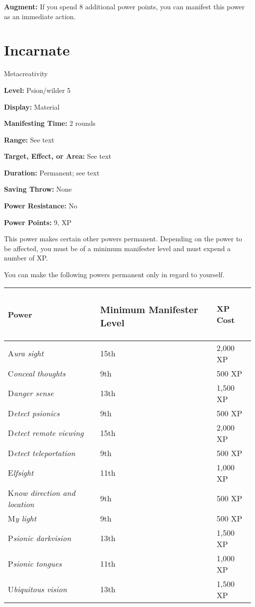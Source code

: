 \documentclass{article}
\begin{document}
\textbf{Augment:} If you spend 8 additional power points, you can manifest this 
power as an immediate action.

\vspace{12pt}
\section*{Incarnate}

Metacreativity

\textbf{Level:} Psion/wilder 5

\textbf{Display:} Material

\textbf{Manifesting Time:} 2 rounds

\textbf{Range:} See text

\textbf{Target, Effect, or Area:} See text

\textbf{Duration:} Permanent; see text

\textbf{Saving Throw:} None

\textbf{Power Resistance:} No

\textbf{Power Points:} 9, XP

This power makes certain other powers permanent. Depending on the power to be affected, 
you must be of a minimum manifester level and must expend a number of XP.

You can make the following powers permanent only in regard to yourself.

\begin{tabular}{|>{\raggedright}p{113pt}|>{\raggedright}p{74pt}|>{\raggedright}p{41pt}|}
\hline
P\textbf{ower} & \subsubsection*{M\textbf{inimum Manifester Level}} & X\textbf{P 
Cost}\tabularnewline
\hline
A\textit{ura sight} & 15th & 2,000 XP\tabularnewline
\hline
C\textit{onceal thoughts} & 9th & 500 XP\tabularnewline
\hline
D\textit{anger sense} & 13th & 1,500 XP\tabularnewline
\hline
D\textit{etect psionics} & 9th & 500 XP\tabularnewline
\hline
D\textit{etect remote viewing} & 15th & 2,000 XP\tabularnewline
\hline
D\textit{etect teleportation} & 9th & 500 XP\tabularnewline
\hline
E\textit{lfsight} & 11th & 1,000 XP\tabularnewline
\hline
K\textit{now direction and location} & 9th & 500 XP\tabularnewline
\hline
M\textit{y light} & 9th & 500 XP\tabularnewline
\hline
P\textit{sionic darkvision} & 13th & 1,500 XP\tabularnewline
\hline
P\textit{sionic tongues} & 11th & 1,000 XP\tabularnewline
\hline
U\textit{biquitous vision} & 13th & 1,500 XP\tabularnewline
\hline
\end{tabular}
\end{document}
